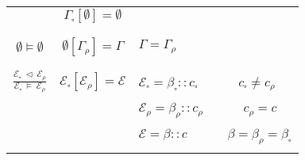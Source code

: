 \documentclass{entcs}
\renewcommand{\~}[0]{\texttildelow}
\begin{document}
\begin{defn}
\begin{center}
{\begin{tabular}{ c | | c | l }
	 & 
    $ \Gamma_{\square}[\emptyset] = \emptyset $ & \\

    & & \\[0.02cm]
    \hline
    & & \\[0.02cm]

	$\emptyset \models \emptyset $ & 
    $ \emptyset[\Gamma_\rho] = \Gamma $ & 
    $\Gamma = \Gamma_\rho $ \\

    & & \\[0.02cm]
    \hline
    & & \\[0.02cm]

	$ \frac{\mathcal{E}_{\square}~\lhd~\mathcal{E}_\rho}{\mathcal{E}_{\square}~\models~\mathcal{E}_\rho} $ & 
    $ \mathcal{E}_{\square}[\mathcal{E}_\rho] = \mathcal{E} $ & 
    $ \mathcal{E}_{\square} = \beta_{\square}::c_{\square} $ ~~~~~ $ c_{\square} \neq c_\rho $ \\

    &  & $ \mathcal{E}_\rho = \beta_\rho::c_\rho $ ~~~~~ $ c_\rho = c $\\

    &  & $ \mathcal{E} = \beta::c $ ~~~~~ $ \beta = \beta_\rho = \beta_{\square} $\\

    & & \\[0.02cm]
    \hline
    \end{tabular}}
    \end{center}

\end{defn}






\end{document}
